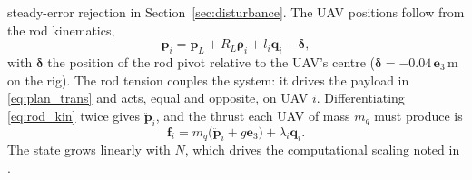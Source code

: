 steady-error rejection in Section~\ref{sec:disturbance}. The UAV positions follow from the rod
kinematics,
\begin{equation}
    \mathbf{p}_i = \mathbf{p}_L + R_L \boldsymbol{\rho}_i + l_i \mathbf{q}_i - \boldsymbol{\delta},
    \label{eq:rod_kin}
\end{equation}
with $\boldsymbol{\delta}$ the position of the rod pivot relative to the UAV's
centre ($\boldsymbol{\delta} = -0.04\,\mathbf{e}_3$\,m on the rig). The rod tension couples the system:
it drives the payload in \eqref{eq:plan_trans} and acts, equal and opposite, on UAV $i$.
Differentiating \eqref{eq:rod_kin} twice gives $\ddot{\mathbf{p}}_i$, and the thrust each UAV of mass
$m_q$ must produce is
\begin{equation}
    \mathbf{f}_i = m_q\big(\ddot{\mathbf{p}}_i + g\mathbf{e}_3\big) + \lambda_i \mathbf{q}_i .
    \label{eq:thrust_req}
\end{equation}
The state grows linearly with $N$, which drives the computational scaling noted in \cite{tudelft}.
